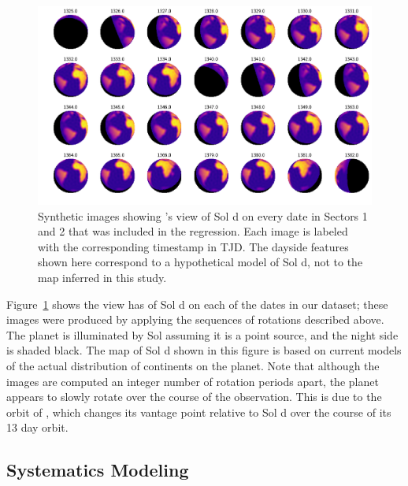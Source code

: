 \documentclass[modern]{aastex62}
\begin{document}
\begin{figure}[t!]
    \begin{centering}
    \includegraphics[width=\linewidth]{figures/phases.pdf}
    \caption{\label{fig:phases}
             Synthetic images showing \TESS's view of Sol d on every date in 
             Sectors 1 and 2 that was included in the regression. Each image 
             is labeled with the corresponding timestamp in TJD. 
             The dayside features shown here correspond to a hypothetical 
             model of Sol d, not to the map inferred in this study.
             }
    \end{centering}
\end{figure}

Figure~\ref{fig:phases} shows the view \TESS has of Sol d on each of the dates
in our dataset; these images were produced by applying the sequences of rotations
described above. The planet is illuminated by Sol assuming it is a point source,
and the night side is shaded black. The map of Sol d shown in this figure is 
based on current models of the actual distribution of continents on the planet.
Note that although the images are computed an integer number of rotation periods
apart, the planet appears to slowly rotate over the course of the observation.
This is due to the orbit of \TESS, which changes its vantage point relative
to Sol d over the course of its 13 day orbit.

\subsection{Systematics Modeling}
\label{sec:systematics}
\end{document}
